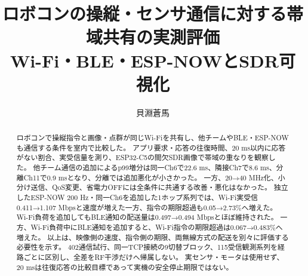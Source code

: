 \documentclass[a4paper,10pt]{ltjsarticle}
\title{\sffamily ロボコンの操縦・センサ通信に対する帯域共有の実測評価\\Wi-Fi・BLE・ESP-NOWとSDR可視化}
\author{貝淵蒼馬}
\date{}
\begin{document}
\maketitle
\begin{abstract}
ロボコンで操縦指令と画像・点群が同じWi-Fiを共有し、他チームやBLE・ESP-NOWも通信する条件を室内で比較した。
アプリ要求・応答の往復時間、20 ms以内に応答がない割合、実受信量を測り、ESP32-C5の間欠SDR画像で帯域の重なりを観察した。
他チーム通信の追加によるp99増分は同一Ch6で22.6 ms、隣接Ch7で8.6 ms、分離Ch11で0.9 msとなり、分離では追加悪化が小さかった。
一方、20→40 MHz化、小分け送信、QoS変更、省電力OFFには全条件に共通する改善・悪化はなかった。
独立したESP-NOW 200 Hz・同一Ch6を追加した1ホップ系列では、Wi-Fi実受信0.411→1.107 Mbpsと速度が増えた一方、指令の期限超過も0.05→2.73\%へ増えた。
Wi-Fi負荷を追加してもBLE通知の配送量は0.497→0.494 Mbpsとほぼ維持された。
一方、Wi-Fi負荷中にBLE通知を追加すると、Wi-Fi指令の期限超過は0.067→0.483\%へ増えた。
以上は、映像側の速度、指令側の期限、両無線方式の配送を別々に評価する必要性を示す。
402通信試行、同一TCP接続の9切替ブロック、115受信観測系列を経路ごとに区別し、全差をRF干渉だけへ帰属しない。
実センサ・モータは使用せず、20 msは往復応答の比較目標であって実機の安全停止期限ではない。
\end{abstract}
\newcommand{\SameIdlePninetyNine}{10.6}
\newcommand{\SameTwentyPninetyNine}{21.0}
\newcommand{\SameHighPninetyNine}{36.9}
\newcommand{\SameHighDeadline}{7.4}
\newcommand{\SameHighGap}{102.9}
\newcommand{\VideoHighRange}{38.4--40.6}
\newcommand{\Conditions}{56}
\newcommand{\ControlPackets}{168000}
\newcommand{\Snapshots}{34320}
\newcommand{\RailMax}{0.0000}
\newcommand{\DutyRatio}{0.418}
\newcommand{\SendJitterRange}{1.06--1.98}
\newcommand{\SixPninetyNine}{26.5}
\newcommand{\SixDeadline}{1.8}
\newcommand{\SixLoss}{0.00}
\newcommand{\SixGap}{68.3}
\newcommand{\SevenPninetyNine}{15.6}
\newcommand{\SevenDeadline}{0.3}
\newcommand{\SevenLoss}{0.00}
\newcommand{\SevenGap}{40.4}
\newcommand{\ElevenPninetyNine}{13.1}
\newcommand{\ElevenDeadline}{0.2}
\newcommand{\ElevenLoss}{0.00}
\newcommand{\ElevenGap}{42.6}
\newcommand{\IdlePninetyNine}{10.8}
\newcommand{\IdleDeadline}{0.0}
\newcommand{\IdleLoss}{0.00}
\newcommand{\IdleGap}{33.0}
\newcommand{\WidthTwentyPninetyNine}{13.8}
\newcommand{\WidthTwentyDeadline}{0.2}
\newcommand{\WidthTwentyLoss}{0.00}
\newcommand{\WidthTwentyGap}{44.3}
\newcommand{\WidthFortyPninetyNine}{20.0}
\newcommand{\WidthFortyDeadline}{1.0}
\newcommand{\WidthFortyLoss}{0.00}
\newcommand{\WidthFortyGap}{62.6}
\newcommand{\LowPowerPninetyNine}{15.1}
\newcommand{\LowPowerDeadline}{0.2}
\newcommand{\LowPowerLoss}{0.00}
\newcommand{\LowPowerGap}{39.3}
\end{document}
